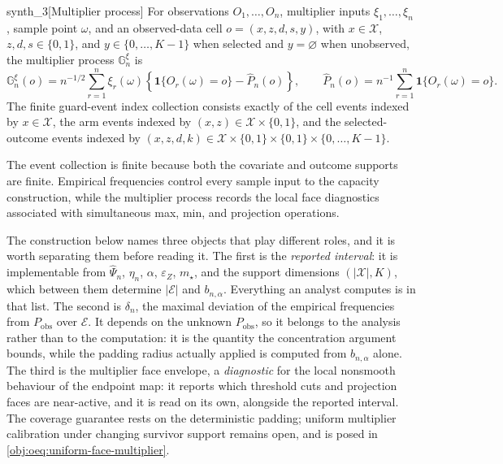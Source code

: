 \begin{definitionv}{synth_3}[Multiplier process]
For observations \(O_1,\ldots,O_n\), multiplier inputs \(\xi_1,\ldots,\xi_n\), sample point \(\omega\), and an observed-data cell \(o=(x,z,d,s,y)\), with \(x\in\mathcal X\), \(z,d,s\in\{0,1\}\), and \(y\in\{0,\ldots,K-1\}\) when selected and \(y=\varnothing\) when unobserved, the multiplier process \(\mathbb G_n^\xi\) is
\[
\mathbb G_n^\xi(o)
=
n^{-1/2}
\sum_{r=1}^n
\xi_r(\omega)
\left\{
\mathbf 1\{O_r(\omega)=o\}
-
\widehat P_n(o)
\right\},
\qquad
\widehat P_n(o)
=
n^{-1}\sum_{r=1}^n \mathbf 1\{O_r(\omega)=o\}.
\]
The finite guard-event index collection consists exactly of the cell events indexed by \(x\in\mathcal X\), the arm events indexed by \((x,z)\in\mathcal X\times\{0,1\}\), and the selected-outcome events indexed by \((x,z,d,k)\in\mathcal X\times\{0,1\}\times\{0,1\}\times\{0,\ldots,K-1\}\).
\end{definitionv}

The event collection  is finite because both the covariate and outcome supports are finite.  Empirical frequencies  control every sample input to the capacity construction, while the multiplier process  records the local face diagnostics associated with simultaneous max, min, and projection operations.

The construction below names three objects that play different roles, and it is worth separating them before reading it.  The first is the \emph{reported interval}: it is implementable from \(\widehat\Psi_n\), \(\eta_n\), \(\alpha\), \(\varepsilon_Z\), \(m_\star\), and the support dimensions \((|\mathcal X|,K)\), which between them determine \(|\mathcal E|\) and \(b_{n,\alpha}\).  Everything an analyst computes is in that list.  The second is \(\delta_n\), the maximal deviation of the empirical frequencies from \(P_{\mathrm{obs}}\) over \(\mathcal E\).  It depends on the unknown \(P_{\mathrm{obs}}\), so it belongs to the analysis rather than to the computation: it is the quantity the concentration argument bounds, while the padding radius actually applied is computed from \(b_{n,\alpha}\) alone.  The third is the multiplier face envelope, a \emph{diagnostic} for the local nonsmooth behaviour of the endpoint map: it reports which threshold cuts and projection faces are near-active, and it is read on its own, alongside the reported interval.  The coverage guarantee rests on the deterministic padding; uniform multiplier calibration under changing survivor support remains open, and is posed in \cref{obj:oeq:uniform-face-multiplier}.

